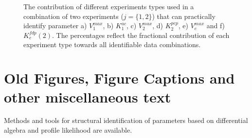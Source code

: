 \documentclass[10pt]{article}
\begin{document}
	\begin{figure}[!tbhp]
		\caption{The contribution of different experiments types used in a combination of two experiments ($j = \{1, 2\}$) that can practically identify parameter a) $V_1^{max}$, b) $K_1^{ac}$, c) $V_2^{max}$, d) $K_2^{pep}$, e) $V_e^{max}$ and f) $K_e^{fdp}(2)$. The percentages reflect the fractional contribution of each experiment type towards all identifiable data combinations.}\label{fig:exp_info}
	\end{figure} 
	
	\clearpage	

	\section{Old Figures, Figure Captions and other miscellaneous text}	
	Methods and tools for structural identification of parameters based on differential algebra \parencite{Ljung1994, Audoly2001, Bellu2007} and profile likelihood \parencite{Raue2014} are available. 
	
\end{document}
